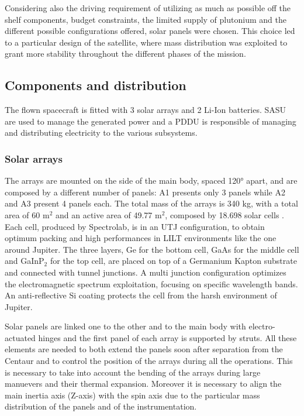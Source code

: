 Considering also the driving requirement of utilizing as much as possible off the shelf components, budget constraints, the limited supply of plutonium and the different possible configurations offered, solar panels were chosen. This choice led to a particular design of the satellite, where mass distribution was exploited to grant more stability throughout the different phases of the mission.  

\subsection{Components and distribution}
\label{subsec:components_and_distribution}

The flown spacecraft is fitted with 3 solar arrays and 2 Li-Ion batteries. SASU are used to manage the generated power and a PDDU is responsible of managing and distributing electricity to the various subsystems. 
\subsubsection{Solar arrays}
\label{susubsec:solar_arrays}

The arrays are mounted on the side of the main body, spaced 120° apart, and are composed by a different number of panels: A1 presents only 3 panels while A2 and A3 present 4 panels each. The total mass of the arrays is 340 kg, with a total area of 60 m$^2$ \cite{arrays_mass} and an active area of 49.77 m$^2$, composed by 18.698 solar cells \cite{masses_ref}. 
Each cell, produced by Spectrolab, is in an UTJ configuration, to obtain optimum packing and high performances in LILT environments like the one around Jupiter. The three layers, Ge for the bottom cell, GaAs for the middle cell and GaInP$_2$ for the top cell, are placed on top of a Germanium Kapton substrate and connected with tunnel junctions. A multi junction configuration optimizes the electromagnetic spectrum exploitation, focusing on specific wavelength bands. An anti-reflective Si coating protects the cell from the harsh environment of Jupiter. 

 Solar panels are linked one to the other and to the main body with electro-actuated hinges and the first panel of each array is supported by struts. All these elements are needed to both extend the panels soon after separation from the Centaur and to control the position of the arrays during all the operations. This is necessary to take into account the bending of the arrays during large manuevers and their thermal expansion. Moreover it is necessary to align the main inertia axis (Z-axis) with the spin axis due to the particular mass distribution of the panels and of the instrumentation.



